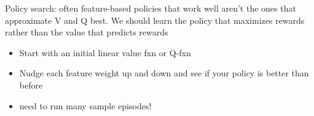 \documentclass[10pt,twocolumn]{article}
\begin{document}
	Policy search: often feature-based policies that work well aren't the ones that approximate V and Q best. We should learn the policy that maximizes rewards rather than the value that predicts rewards
	\begin{itemize}
		\item Start with an initial linear value fxn or Q-fxn
		\item Nudge each feature weight up and down and see if your policy is better than before
		\item need to run many sample episodes!
	\end{itemize}
\end{document}
